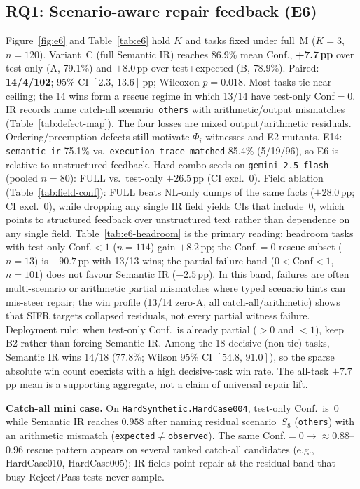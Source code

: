 \documentclass[10pt,conference]{IEEEtran}
\newcommand{\runin}[1]{\medskip\noindent\textbf{#1}\enspace}
\begin{document}
\subsection{RQ1: Scenario-aware repair feedback (E6)}
Figure~\ref{fig:e6} and Table~\ref{tab:e6} hold $K$ and tasks fixed under
full~M ($K{=}3$, $n{=}120$).
Variant~C (full Semantic IR) reaches 86.9\% mean Conf., \textbf{+7.7\,pp}
over test-only (A, 79.1\%) and ${+}8.0$\,pp over test+expected (B, 78.9\%).
Paired: \textbf{14/4/102}; 95\% CI $[2.3,\,13.6]$\,pp; Wilcoxon $p{=}0.018$.
Most tasks tie near ceiling; the 14 wins form a rescue regime in which 13/14
have test-only Conf${=}0$.
IR records name catch-all scenario~\texttt{others} with arithmetic/output
mismatches (Table~\ref{tab:defect-map}).
The four losses are mixed output/arithmetic residuals.
Ordering/preemption defects still motivate $\Phi_i$ witnesses and E2 mutants.
E14: \texttt{semantic\_ir} 75.1\% vs.\ \texttt{execution\_trace\_matched}
85.4\% (5/19/96), so E6 is relative to unstructured feedback.
Hard combo seeds on \texttt{gemini-2.5-flash} (pooled $n{=}80$): FULL vs.\
test-only ${+}26.5$\,pp (CI excl.~0).
Field ablation (Table~\ref{tab:field-conf}): FULL beats NL-only dumps of the
same facts (${+}28.0$\,pp; CI excl.~0), while dropping any single IR field
yields CIs that include~0, which points to structured feedback over
unstructured text rather than dependence on any single field.
Table~\ref{tab:e6-headroom} is the primary reading: headroom tasks with
test-only Conf.${<}1$ ($n{=}114$) gain ${+}8.2$\,pp; the Conf.${=}0$ rescue
subset ($n{=}13$) is ${+}90.7$\,pp with 13/13 wins; the partial-failure band
($0{<}$Conf${<}1$, $n{=}101$) does not favour Semantic IR (${-}2.5$\,pp).
In this band, failures are often multi-scenario or arithmetic partial
mismatches where typed scenario hints can mis-steer repair; the win profile
(13/14 zero-A, all catch-all/arithmetic) shows that SIFR targets collapsed
residuals, not every partial witness failure.
Deployment rule: when test-only Conf.\ is already partial (${>}0$ and ${<}1$),
keep B2 rather than forcing Semantic IR.
Among the 18 decisive (non-tie) tasks, Semantic IR wins 14/18 (77.8\%;
Wilson 95\% CI $[54.8,\,91.0]$), so the sparse absolute win count coexists
with a high decisive-task win rate.
The all-task ${+}7.7$\,pp mean is a supporting aggregate, not a claim of
universal repair lift.

\runin{Catch-all mini case.}
On \texttt{HardSynthetic.HardCase004}, test-only Conf.\ is~$0$ while Semantic IR
reaches $0.958$ after naming residual scenario~$S_8$ (\texttt{others}) with an
arithmetic mismatch (\texttt{expected}$\neq$\texttt{observed}).
The same Conf.${=}0\!\to\!{\approx}0.88$--$0.96$ rescue pattern appears on several
ranked catch-all candidates (e.g., HardCase010, HardCase005); IR fields point
repair at the residual band that busy Reject/Pass tests never sample.
\end{document}
